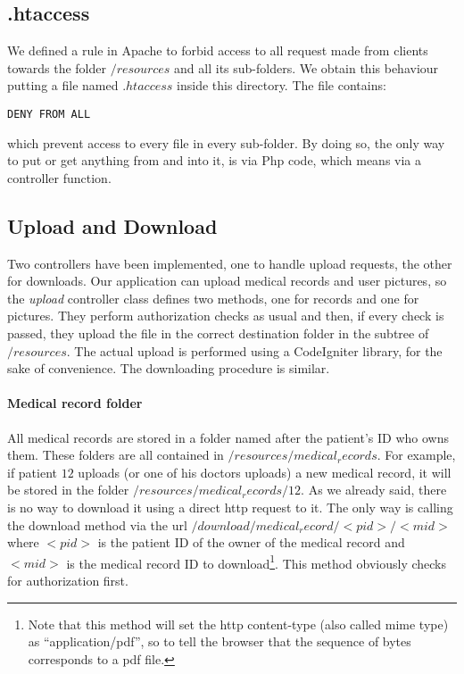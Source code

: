 \subsection{.htaccess}
We defined a rule in Apache to forbid access to all request made from clients towards the folder $/resources$ and all its sub-folders. We obtain this behaviour putting a file named $.htaccess$ inside this directory. The file contains:
\begin{verbatim}
DENY FROM ALL 
\end{verbatim}
which prevent access to every file in every sub-folder. By doing so, the only way to put or get anything from and into it, is via Php code, which means via a controller function.

\subsection{Upload and Download}
Two controllers have been implemented, one to handle upload requests, the other for downloads. Our application can upload medical records and user pictures, so the \emph{upload} controller class defines two methods, one for records and one for pictures. They perform authorization checks as usual and then, if every check is passed, they upload the file in the correct destination folder in the subtree of $/resources$. The actual upload is performed using a CodeIgniter library, for the sake of convenience. The downloading procedure is similar.

\paragraph{Medical record folder}
All medical records are stored in a folder named after the patient's ID who owns them. These folders are all contained in $/resources/medical_records$. For example, if patient $12$ uploads (or one of his doctors uploads) a new medical record, it will be stored in the folder $/resources/medical_records/12$. As we already said, there is no way to download it using a direct http request to it. The only way is calling the download method via the url $/download/medical_record/<pid>/<mid>$ where $<pid>$ is the patient ID of the owner of the medical record and $<mid>$ is the medical record ID to download\footnote{Note that this method will set the http content-type (also called mime type) as ``application/pdf'', so to tell the browser that the sequence of bytes corresponds to a pdf file.}. This method obviously checks for authorization first.

